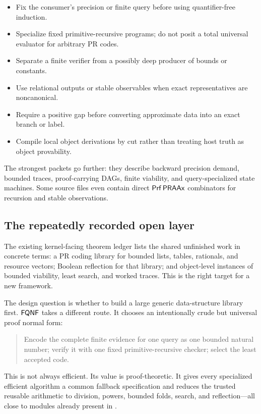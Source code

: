 \begin{itemize}
\item Fix the consumer's precision or finite query before using
quantifier-free induction.
\item Specialize fixed primitive-recursive programs; do not posit a total
universal evaluator for arbitrary PR codes.
\item Separate a finite verifier from a possibly deep producer of bounds or
constants.
\item Use relational outputs or stable observables when exact representatives
are noncanonical.
\item Require a positive gap before converting approximate data into an exact
branch or label.
\item Compile local object derivations by cut rather than treating host truth
as object provability.
\end{itemize}

The strongest packets go further: they describe backward precision demand,
bounded traces, proof-carrying DAGs, finite viability, and query-specialized
state machines.  Some source files even contain direct
\(\mathsf{Prf}\,\mathsf{PRAAx}\) combinators for recursion and stable observations.

\subsection{The repeatedly recorded open layer}

The existing kernel-facing theorem ledger lists the shared unfinished work in
concrete terms: a PR coding library for bounded lists, tables, rationals, and
resource vectors; Boolean reflection for that library; and object-level
instances of bounded viability, least search, and worked traces.  This is the
right target for a new framework.

The design question is whether to build a large generic data-structure library
first.  \(\mathsf{FQNF}\) takes a different route.  It chooses an intentionally crude
but universal proof normal form:

\begin{quote}
Encode the complete finite evidence for one query as one bounded natural
number; verify it with one fixed primitive-recursive checker; select the least
accepted code.
\end{quote}

This is not always efficient.  Its value is proof-theoretic.  It gives every
specialized efficient algorithm a common fallback specification and reduces the
trusted reusable arithmetic to division, powers, bounded folds, search, and
reflection---all close to modules already present in .


